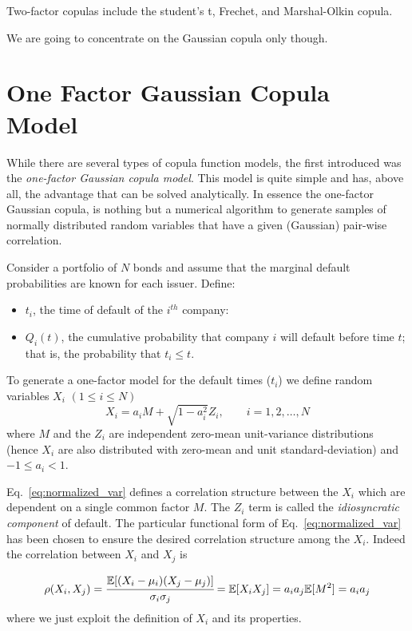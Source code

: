 Two-factor copulas include the student’s t, Frechet, and Marshal-Olkin copula. 

We are going to concentrate on the Gaussian copula only though.

\section{One Factor Gaussian Copula Model}
While there are several types of copula function models, the first introduced was the \emph{one-factor Gaussian copula model}. This model is quite simple and has, above all, the advantage that can be solved analytically. In essence the one-factor Gaussian copula, is nothing but a numerical algorithm to generate samples of normally distributed random variables that have a given (Gaussian) pair-wise correlation. 

Consider a portfolio of \(N\) bonds and assume that the marginal default probabilities are known for each issuer. Define:

\begin{itemize}
	\tightlist
	\item
	\(t_i\), the time of default of the \(i^{th}\) company:
	\item
	\(Q_i(t)\), the cumulative probability that company \(i\) will default before time \(t\); that is, the probability that \(t_i \le t\).
\end{itemize}

To generate a one-factor model for the default times (\(t_i\)) we define random variables \(X_i\) \((1\le i \le N)\)
\begin{equation}
X_i = a_i M + \sqrt{1-a_i^2}Z_i,\qquad i = 1, 2,\ldots, N
\label{eq:normalized_var}
\end{equation}
where \(M\) and the \(Z_i\) are independent zero-mean unit-variance  distributions (hence $X_i$ are also distributed with zero-mean and unit standard-deviation) and \(-1 \le a_i \lt 1\).

Eq.~\ref{eq:normalized_var} defines a correlation structure between the \(X_i\) which are dependent on a single common factor \(M\). The $Z_i$ term is called the \emph{idiosyncratic component} of default. The particular functional form of Eq.~\ref{eq:normalized_var} has been chosen to ensure the desired correlation structure among the $X_i$. Indeed the correlation between \(X_i\) and \(X_j\) is

\begin{equation*}
\rho(X_i, X_j) = \cfrac{\mathbb{E}[(X_i-\mu_i)(X_j-\mu_j)]}{\sigma_{i}\sigma_{j}} =\mathbb{E}[X_i X_j] = a_i a_j \mathbb{E}[M^2] = a_i a_j
\end{equation*}
where we just exploit the definition of $X_i$ and its properties.

